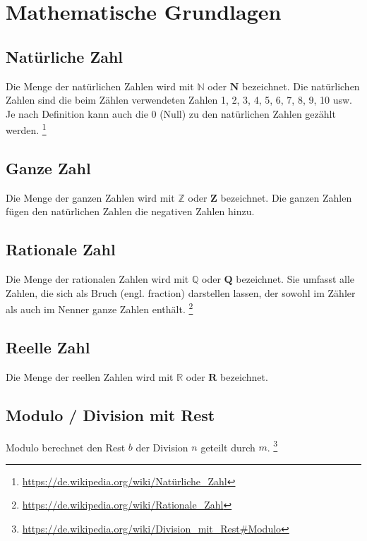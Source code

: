 \documentclass{lehramt-informatik-haupt}
\begin{document}

\chapter{Mathematische Grundlagen}

\section{Natürliche Zahl}

Die Menge der natürlichen Zahlen wird mit $\mathbb{N}$ oder $\mathbf{N}$
bezeichnet. Die natürlichen Zahlen sind die beim Zählen verwendeten
Zahlen 1, 2, 3, 4, 5, 6, 7, 8, 9, 10 usw. Je nach Definition kann auch
die 0 (Null) zu den natürlichen Zahlen gezählt werden.
\footnote{\url{https://de.wikipedia.org/wiki/Natürliche_Zahl}}

\section{Ganze Zahl}

Die Menge der ganzen Zahlen wird mit $\mathbb{Z}$ oder $\mathbf{Z}$
bezeichnet. Die ganzen Zahlen fügen den natürlichen Zahlen die negativen
Zahlen hinzu.

\section{Rationale Zahl}

Die Menge der rationalen Zahlen wird mit $\mathbb{Q}$ oder $\mathbf{Q}$
bezeichnet. Sie umfasst alle Zahlen, die sich als Bruch (engl.
fraction) darstellen lassen, der sowohl im Zähler als auch im Nenner
ganze Zahlen enthält.
\footnote{\url{https://de.wikipedia.org/wiki/Rationale_Zahl}}

\section{Reelle Zahl}

Die Menge der reellen Zahlen wird mit $\mathbb{R}$ oder $\mathbf{R}$
bezeichnet.

\section{Modulo / Division mit Rest}

Modulo berechnet den Rest $b$ der Division $n$ geteilt durch $m$.
\footnote{\url{https://de.wikipedia.org/wiki/Division_mit_Rest\#Modulo}}
\end{document}
